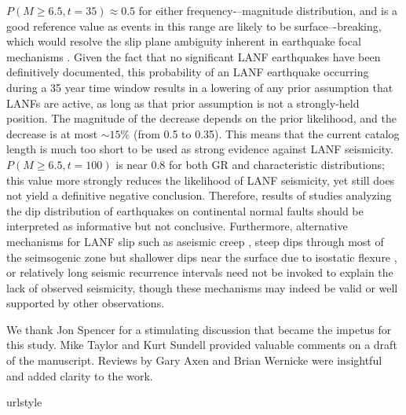 \documentclass[draft,grl]{AGUTeX}
\begin{document}
\begin{article}
$P(M \ge  6.5, t = 35) \approx 0.5$ for either frequency-–magnitude
distribution, and is a good reference value as events in this range are likely
to be surface–-breaking, which would resolve the slip plane ambiguity inherent
in earthquake focal mechanisms \citep{hecker2013eqdist}. Given the fact that no
significant LANF earthquakes have been definitively documented, this
probability of an LANF earthquake occurring during a 35 year time window
results in a lowering of any prior assumption that LANFs are active, as long as
that prior assumption is not a strongly-held position. The magnitude of the
decrease depends on the prior likelihood, and the decrease is at most $\sim 15
\%$ (from 0.5 to 0.35). This means that the current catalog length is much too
short to be used as strong evidence against LANF seismicity.  $P(M\ge6.5,
t=100)$ is near 0.8 for both GR and characteristic distributions; this value
more strongly reduces the likelihood of LANF seismicity, yet still does not
yield a definitive negative conclusion.  Therefore, results of studies
analyzing the dip distribution of earthquakes on continental normal faults
\citep{jackson1987, collettinisibson2001} should be interpreted as informative
but not conclusive. Furthermore, alternative mechanisms for LANF slip such as
aseismic creep \citep [e.g.,][] {collettini2011lanfmech,
hreinsdottir2009altotib}, steep dips through most of the seimsogenic zone but
shallower dips near the surface due to isostatic flexure \citep[e.g.,][]
{wernickeaxen1988rolling}, or relatively long seismic recurrence intervals
\citep{wernicke1995seis} need not be invoked to explain the lack of observed
seismicity, though these mechanisms may indeed be valid or well supported by
other observations.



\begin{acknowledgements}
We thank Jon Spencer for a stimulating discussion that became the impetus for
this study. Mike Taylor and Kurt Sundell provided valuable comments on a draft
of the manuscript. Reviews by Gary Axen and Brian Wernicke were insightful
and added clarity to the work.
 
\end{acknowledgements}


\begin{thebibliography}{46}
\providecommand{\natexlab}[1]{#1}
\expandafter\ifx\csname urlstyle\endcsname\relax
  \providecommand{\doi}[1]{doi:\discretionary{}{}{}#1}\else
  \providecommand{\doi}{doi:\discretionary{}{}{}\begingroup
  \urlstyle{rm}\Url}\fi


\end{thebibliography}
\end{article}
\end{document}
